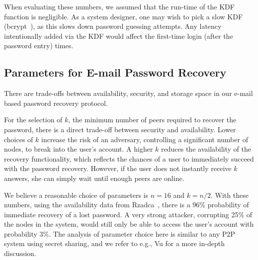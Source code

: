 When evaluating these numbers, we assumed that the run-time of the KDF
function is negligible. As a system designer, one may wish to pick a slow KDF
(\eg bcrypt~\cite{DBLP:conf/usenix/ProvosM99}), as this slows down
password guessing attempts. Any latency intentionally added via the KDF would
affect the first-time login (after the password entry) times.


\subsection{Parameters for E-mail Password Recovery} 



There are trade-offs between availability, security, and storage space in our e-mail based password recovery protocol.

For the selection of $k$, the minimum number of peers required to
recover the password, there is a direct trade-off between security and
availability.  Lower choices of $k$ increase the risk of an adversary,
controlling a significant number of nodes, to break into the user's
account. A higher $k$ reduces the availability of the recovery
functionality, which reflects the chances of a user to immediately
succeed with the password recovery.  However, if the user does not
instantly receive $k$ answers, she can simply wait until enough peers
are online.


We believe a reasonable choice of parameters is $n = 16$ and $k = n/2$. With
these numbers, using the availability data from Rzadca\etal~\cite{RzadcaDB10},
there is a 96\% probability of immediate recovery of a lost password. A very
strong attacker, corrupting 25\% of the nodes in the system, would still only
be able to access the user's account with probability 3\%.  The analysis of
parameter choice here is similar to any P2P system using secret sharing, and
we refer to e.g., Vu\etal \cite{Vu_Aberer_Buchegger_Datta_2009} for a more
in-depth discussion.

